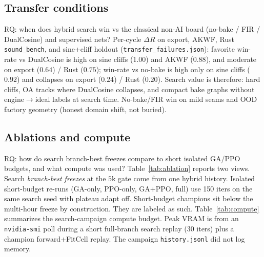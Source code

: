 \subsection{Transfer conditions}
\label{sec:transfer}

RQ: when does hybrid search win vs the classical non-AI board (no-bake / FIR / DualCosine) and supervised nets?
Per-cycle $\Delta R$ on export, AKWF, Rust \texttt{sound\_bench}, and sine{+}cliff holdout (\texttt{transfer\_failures.json}):
favorite win-rate vs DualCosine is high on sine cliffs ($1.00$) and AKWF ($0.88$), and moderate on export ($0.64$) / Rust ($0.75$);
win-rate vs no-bake is high only on sine cliffs ($0.92$) and collapses on export ($0.24$) / Rust ($0.20$).
Search value is therefore: hard cliffs, OA tracks where DualCosine collapses, and compact bake graphs without engine$\to$ideal labels at search time.
No-bake/FIR win on mild seams and OOD factory geometry (honest domain shift, not buried).

\subsection{Ablations and compute}
\label{sec:ablation-compute}

RQ: how do search branch-best freezes compare to short isolated GA/PPO budgets, and what compute was used?
Table~\ref{tab:ablation} reports two views. Search \emph{branch-best freezes} at the $5$k gate come from one hybrid history. Isolated short-budget re-runs (GA-only, PPO-only, GA{+}PPO, full) use 150 iters on the same search seed with plateau adapt off.
Short-budget champions sit below the multi-hour freeze by construction. They are labeled as such.
Table~\ref{tab:compute} summarizes the search-campaign compute budget. Peak VRAM is from an \texttt{nvidia-smi} poll during a short full-branch search replay (30 iters) plus a champion forward{+}FitCell replay. The campaign \texttt{history.jsonl} did not log memory.

